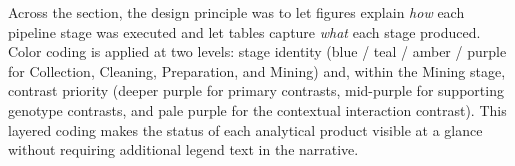 \documentclass[12pt]{article}
\begin{document}
Across the section, the design principle was to let figures explain \emph{how} each pipeline
stage was executed and let tables capture \emph{what} each stage produced.
Color coding is applied at two levels: stage identity (blue / teal / amber / purple for
Collection, Cleaning, Preparation, and Mining) and, within the Mining stage, contrast priority
(deeper purple for primary contrasts, mid-purple for supporting genotype contrasts, and pale
purple for the contextual interaction contrast).
This layered coding makes the status of each analytical product visible at a glance without
requiring additional legend text in the narrative.
\end{document}
